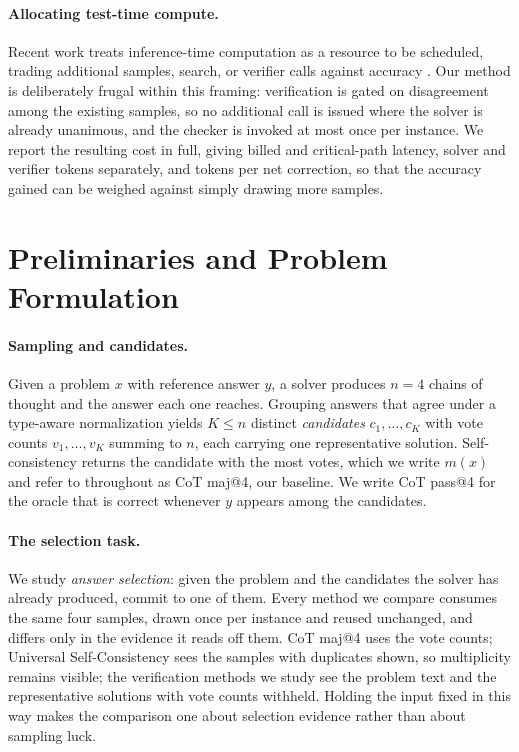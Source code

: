 \documentclass[letterpaper]{article} %
\begin{document}
\paragraph{Allocating test-time compute.}
Recent work treats inference-time computation as a resource to be scheduled,
trading additional samples, search, or verifier calls against accuracy \cite{snell2024scaling}. Our method is deliberately frugal within this framing: verification is gated on disagreement among the existing samples, so no
additional call is issued where the solver is already unanimous, and the checker
is invoked at most once per instance. We report the resulting cost in full,
giving billed and critical-path latency, solver and verifier tokens separately, and
tokens per net correction, so that the accuracy gained can be weighed against
simply drawing more samples.

\section{Preliminaries and Problem Formulation}
\label{sec:prelim}

\paragraph{Sampling and candidates.}
Given a problem $x$ with reference answer $y$, a solver produces $n = 4$ chains
of thought and the answer each one reaches. Grouping answers that agree under a
type-aware normalization yields $K \le n$ distinct \emph{candidates}
$c_1, \dots, c_K$ with vote counts $v_1, \dots, v_K$ summing to $n$, each
carrying one representative solution. Self-consistency \cite{wang2022self}
returns the candidate with the most votes, which we write $m(x)$ and refer to
throughout as CoT maj@4, our baseline. We write CoT pass@4 for the oracle that
is correct whenever $y$ appears among the candidates.

\paragraph{The selection task.}
We study \emph{answer selection}: given the problem and the candidates the
solver has already produced, commit to one of them. Every method we compare
consumes the same four samples, drawn once per instance and reused unchanged,
and differs only in the evidence it reads off them. CoT maj@4 uses the vote
counts; Universal Self-Consistency \cite{chen2023universal} sees the samples
with duplicates shown, so multiplicity remains visible; the verification
methods we study see the problem text and the representative solutions with
vote counts withheld. Holding the input fixed in this way makes the comparison
one about selection evidence rather than about sampling luck.
\end{document}

